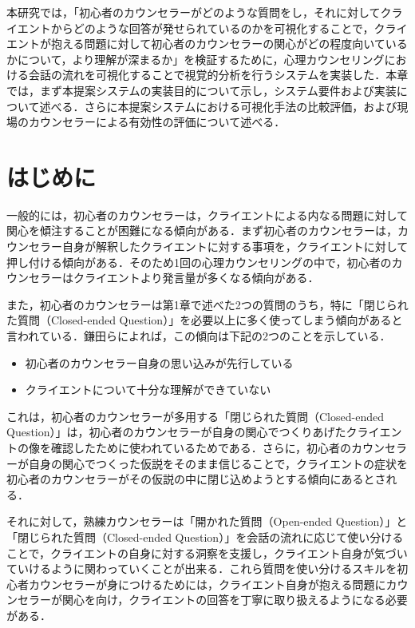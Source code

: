 \documentclass[shuuron]{kuee}
\begin{document}
本研究では，「初心者のカウンセラーがどのような質問をし，それに対してクライエントからどのような回答が発せられているのかを可視化することで，クライエントが抱える問題に対して初心者のカウンセラーの関心がどの程度向いているかについて，より理解が深まるか」を検証するために，心理カウンセリングにおける会話の流れを可視化することで視覚的分析を行うシステムを実装した．本章では，まず本提案システムの実装目的について示し，システム要件および実装について述べる．さらに本提案システムにおける可視化手法の比較評価，および現場のカウンセラーによる有効性の評価について述べる．

\section{はじめに}%





一般的には，初心者のカウンセラーは，クライエントによる内なる問題に対して関心を傾注することが困難になる傾向がある．まず初心者のカウンセラーは，カウンセラー自身が解釈したクライエントに対する事項を，クライエントに対して押し付ける傾向がある．そのため1回の心理カウンセリングの中で，初心者のカウンセラーはクライエントより発言量が多くなる傾向がある．

また，初心者のカウンセラーは第1章で述べた2つの質問のうち，特に「閉じられた質問（Closed-ended Question）」を必要以上に多く使ってしまう傾向があると言われている．鎌田ら\cite{Darshana}によれば，この傾向は下記の2つのことを示している．
\begin{itemize}
  \item 初心者のカウンセラー自身の思い込みが先行している
  \item クライエントについて十分な理解ができていない
\end{itemize}


これは，初心者のカウンセラーが多用する「閉じられた質問（Closed-ended Question）」は，初心者のカウンセラーが自身の関心でつくりあげたクライエントの像を確認したために使われているためである．さらに，初心者のカウンセラーが自身の関心でつくった仮説をそのまま信じることで，クライエントの症状を初心者のカウンセラーがその仮説の中に閉じ込めようとする傾向にあるとされる．

それに対して，熟練カウンセラーは「開かれた質問（Open-ended Question）」と「閉じられた質問（Closed-ended Question）」を会話の流れに応じて使い分けることで，クライエントの自身に対する洞察を支援し，クライエント自身が気づいていけるように関わっていくことが出来る．これら質問を使い分けるスキルを初心者カウンセラーが身につけるためには，クライエント自身が抱える問題にカウンセラーが関心を向け，クライエントの回答を丁寧に取り扱えるようになる必要がある．
\end{document}
